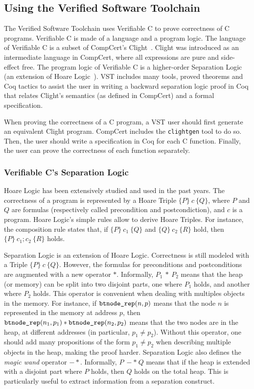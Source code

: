 \subsection{Using the Verified Software Toolchain}
The Verified Software Toolchain uses Verifiable C to prove correctness of C programs.
Verifiable C is made of a language and a program logic.
The language of Verifiable C is a subset of CompCert's Clight~\cite{clight}.
Clight was introduced as an intermediate language in CompCert, where all expressions are pure and side-effect free.
The program logic of Verifiable C is a higher-order Separation Logic~\cite{sep} (an extension of Hoare Logic~\cite{hoare}).
VST includes many tools, proved theorems and Coq tactics to assist the user in writing a backward separation logic proof in Coq that relates Clight's semantics (as defined in CompCert) and a formal specification.

When proving the correctness of a C program, a VST user should first generate an equivalent Clight program.
CompCert includes the \texttt{clightgen} tool to do so. Then, the user should write a specification in Coq for each C function.
Finally, the user can prove the correctness of each function separately.

\subsubsection{Verifiable C's Separation Logic}
Hoare Logic has been extensively studied and used in the past years.
The correctness of a program is represented by a Hoare Triple $\{P\}~c~\{Q\}$, where $P$ and $Q$ are formulas (respectively called precondition and postcondiction), and $c$ is a program.
Hoare Logic's simple rules allow to derive Hoare Triples. For instance, the composition rule states that, if $\{P\}~c_1~\{Q\}$ and $\{Q\}~c_2~\{R\}$ hold, then $\{P\}~c_1;c_2~\{R\}$ holds.

Separation Logic is an extension of Hoare Logic. Correctness is still modeled with a Triple $\{P\}~c~\{Q\}$. However, the formulas for preconditions and postconditions are augmented with a new operator $*$.
Informally, $P_1~*~P_2$ means that the heap (or memory) can be split into two disjoint parts, one where $P_1$ holds, and another where $P_2$ holds.
This operator is convenient when dealing with multiples objects in the memory.
For instance, if $\texttt{btnode\_rep}(n,p)$ means that the node $n$ is represented in the memory at address $p$, then $\texttt{btnode\_rep}(n_1,p_1)*\texttt{btnode\_rep}(n_2,p_2)$ means that the two nodes are in the heap, at different addresses (in particular, $p_1\neq p_2$).
Without this operator, one should add many propositions of the form $p_1\neq p_2$ when describing multiple objects in the heap, making the proof harder.
Separation Logic also defines the \textit{magic wand} operator $-*$. Informally, $P~-*~Q$ means that if the heap is extended with a disjoint part where $P$ holds, then $Q$ holds on the total heap.
This is particularly useful to extract information from a separation construct. 

